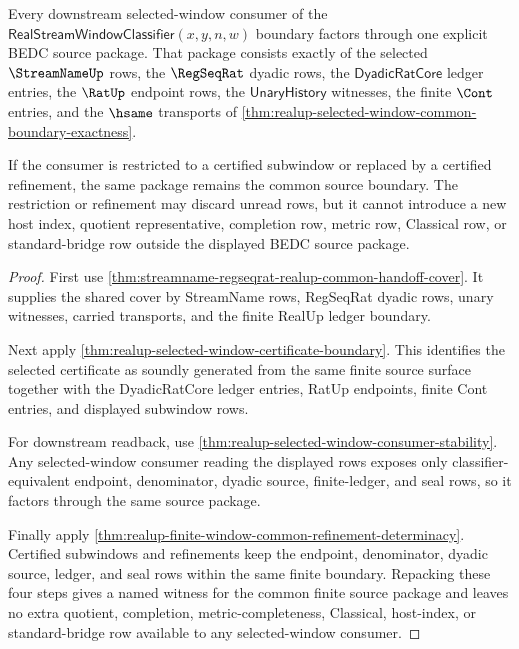 \begin{theorem}
\label{thm:realup-selected-window-common-boundary-witness}
Every downstream selected-window consumer of the
$\mathsf{RealStreamWindowClassifier}(x,y,n,w)$ boundary factors through one
explicit BEDC source package. That package consists exactly of the selected
$\StreamNameUp$ rows, the $\RegSeqRat$ dyadic rows, the
$\mathsf{DyadicRatCore}$ ledger entries, the $\RatUp$ endpoint rows, the
$\mathsf{UnaryHistory}$ witnesses, the finite $\Cont$ entries, and the
$\hsame$ transports of
\autoref{thm:realup-selected-window-common-boundary-exactness}.

If the consumer is restricted to a certified subwindow or replaced by a
certified refinement, the same package remains the common source boundary. The
restriction or refinement may discard unread rows, but it cannot introduce a
new host index, quotient representative, completion row, metric row, Classical
row, or standard-bridge row outside the displayed BEDC source package.
\end{theorem}
\begin{proof}
First use
\autoref{thm:streamname-regseqrat-realup-common-handoff-cover}. It supplies
the shared cover by StreamName rows, RegSeqRat dyadic rows, unary witnesses,
carried transports, and the finite RealUp ledger boundary.

Next apply \autoref{thm:realup-selected-window-certificate-boundary}. This
identifies the selected certificate as soundly generated from the same finite
source surface together with the DyadicRatCore ledger entries, RatUp endpoints,
finite Cont entries, and displayed subwindow rows.

For downstream readback, use
\autoref{thm:realup-selected-window-consumer-stability}. Any selected-window
consumer reading the displayed rows exposes only classifier-equivalent endpoint,
denominator, dyadic source, finite-ledger, and seal rows, so it factors through
the same source package.

Finally apply
\autoref{thm:realup-finite-window-common-refinement-determinacy}. Certified
subwindows and refinements keep the endpoint, denominator, dyadic source,
ledger, and seal rows within the same finite boundary. Repacking these four
steps gives a named witness for the common finite source package and leaves no
extra quotient, completion, metric-completeness, Classical, host-index, or
standard-bridge row available to any selected-window consumer.
\end{proof}

